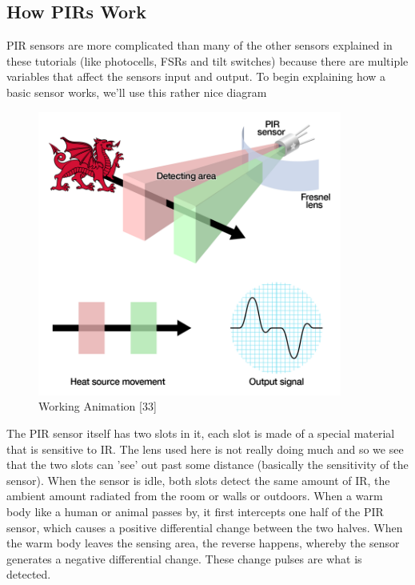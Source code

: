 \documentclass[twoside,a4paper,16pt]{book}
\begin{document}
{{\subsection{How PIRs Work}
PIR sensors are more complicated than many of the other sensors explained in these tutorials (like photocells, FSRs and tilt switches) because there are multiple variables that affect the sensors input and output. To begin explaining how a basic sensor works, we'll use this rather nice diagram
\begin{figure}[ht!]
	\begin{center}
		\includegraphics[width=10.0cm]{15.png}
		\caption{Working Animation [33]}
	\end{center}
\end{figure}
The PIR sensor itself has two slots in it, each slot is made of a special material that is sensitive to IR. The lens used here is not really doing much and so we see that the two slots can 'see' out past some distance (basically the sensitivity of the sensor). When the sensor is idle, both slots detect the same amount of IR, the ambient amount radiated from the room or walls or outdoors. When a warm body like a human or animal passes by, it first intercepts one half of the PIR sensor, which causes a positive differential change between the two halves. When the warm body leaves the sensing area, the reverse happens, whereby the sensor generates a negative differential change. These change pulses are what is detected.

}}
\end{document}
